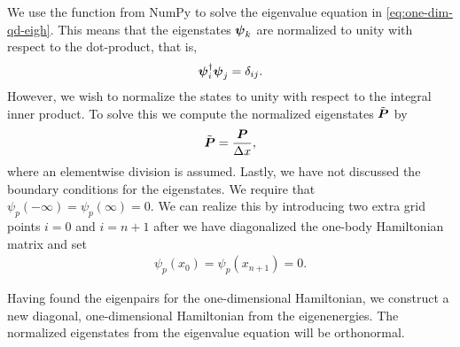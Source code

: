         We use the function  from NumPy \cite{numpy} to
        solve the eigenvalue equation in \autoref{eq:one-dim-qd-eigh}.
        This means that the eigenstates $\boldsymbol{\psi}_k$ are normalized to unity
        with respect to the dot-product, that is,
        \begin{align}
            \boldsymbol{\psi}_i^{\dagger} \boldsymbol{\psi}_j = \delta_{ij}.
        \end{align}
        However, we wish to normalize the states to unity with respect to the
        integral inner product.
        To solve this we compute the normalized eigenstates $\tilde{\boldsymbol{P}}$ by
        \begin{align}
            \tilde{\boldsymbol{P}} = \frac{\boldsymbol{P}}{\Delta x},
        \end{align}
        where an elementwise division is assumed.
        Lastly, we have not discussed the boundary conditions for the
        eigenstates.
        We require that $\psi_p(-\infty) = \psi_p(\infty) = 0$.
        We can realize this by introducing two extra grid points $i = 0$ and $i
        = n + 1$ after we have diagonalized the one-body Hamiltonian matrix and
        set
        \begin{align}
            \psi_p(x_0) = \psi_p(x_{n + 1}) = 0.
        \end{align}

        Having found the eigenpairs for the one-dimensional Hamiltonian, we
        construct a new diagonal, one-dimensional Hamiltonian from the
        eigenenergies.
        The normalized eigenstates from the eigenvalue equation will be
        orthonormal.


